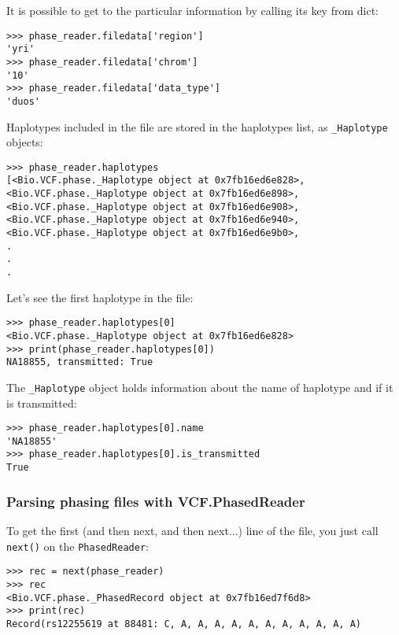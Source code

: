 \noindent It is possible to get to the particular information by calling its key from dict:

\begin{verbatim}
>>> phase_reader.filedata['region']
'yri'
>>> phase_reader.filedata['chrom']
'10'
>>> phase_reader.filedata['data_type']
'duos'

\end{verbatim}

\noindent Haplotypes included in the file are stored in the haplotypes list, as \verb|_Haplotype| objects:

\begin{verbatim}
>>> phase_reader.haplotypes
[<Bio.VCF.phase._Haplotype object at 0x7fb16ed6e828>,
<Bio.VCF.phase._Haplotype object at 0x7fb16ed6e898>,
<Bio.VCF.phase._Haplotype object at 0x7fb16ed6e908>,
<Bio.VCF.phase._Haplotype object at 0x7fb16ed6e940>,
<Bio.VCF.phase._Haplotype object at 0x7fb16ed6e9b0>,
.
.
.

\end{verbatim}

\noindent Let's see the first haplotype in the file:

\begin{verbatim}
>>> phase_reader.haplotypes[0]
<Bio.VCF.phase._Haplotype object at 0x7fb16ed6e828>
>>> print(phase_reader.haplotypes[0])
NA18855, transmitted: True

\end{verbatim}

\noindent The \verb|_Haplotype| object holds information about the name of haplotype and if it is transmitted:

\begin{verbatim}
>>> phase_reader.haplotypes[0].name
'NA18855'
>>> phase_reader.haplotypes[0].is_transmitted
True

\end{verbatim}

\subsubsection{Parsing phasing files with VCF.PhasedReader}

\noindent To get the first (and then next, and then next...) line of the file, you just call \verb|next()| on the \verb|PhasedReader|:

\begin{verbatim}
>>> rec = next(phase_reader)
>>> rec
<Bio.VCF.phase._PhasedRecord object at 0x7fb16ed7f6d8>
>>> print(rec)
Record(rs12255619 at 88481: C, A, A, A, A, A, A, A, A, A, A, A)

\end{verbatim}

